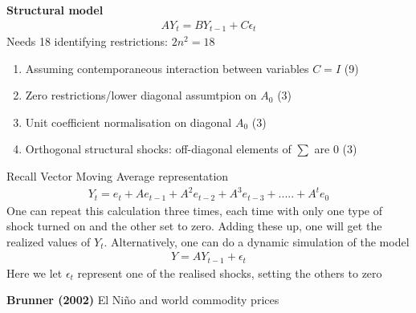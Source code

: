 \documentclass{beamer}
\begin{document}
\begin{frame}
  \textbf{Structural model}
\begin{align*}
  AY_t=BY_{t-1} + C\epsilon_t
\end{align*}
 \medskip
 Needs 18 identifying restrictions: $2n^2=18$
 \begin{enumerate}
   \item Assuming contemporaneous interaction between variables $C=I$ (9)
   \item Zero restrictions/lower diagonal assumtpion on $A_0$ (3)
   \item Unit coefficient normalisation on diagonal $A_0$ (3)
   \item Orthogonal structural shocks: off-diagonal elements of $\sum$ are 0 (3)
 \end{enumerate}
\end{frame}

\begin{frame}
  Recall Vector Moving Average representation    
\begin{align*}
  Y_t = e_t + Ae_{t-1} + A^2e_{t-2} + A^3e_{t-3} + ..... + A^te_0
\end{align*}
One can repeat this calculation three times, each time with only one type of shock turned on and the other set to zero. 
Adding these up, one will get the realized values of $Y_t$.
Alternatively, one can do a dynamic simulation of the model
\begin{align*}
  Y=AY_{t-1}+\epsilon_t
\end{align*}
Here we let $\epsilon_t$ represent one of the realised shocks, setting the others to zero
\end{frame}

\begin{frame}
  \textbf{Brunner (2002)} El Niño and world commodity prices
  
\end{frame}
\end{document}
